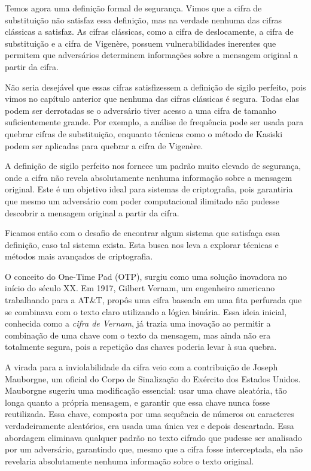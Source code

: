 Temos agora uma definição formal de segurança.
Vimos que a cifra de substituição não satisfaz essa definição, mas na verdade nenhuma das cifras clássicas a satisfaz.
As cifras clássicas, como a cifra de deslocamente, a cifra de substituição e a cifra de Vigenère, possuem vulnerabilidades inerentes que permitem que adversários determinem informações sobre a mensagem original a partir da cifra.

Não seria desejável que essas cifras satisfizessem a definição de sigilo perfeito, pois vimos no capítulo anterior que nenhuma das cifras clássicas é segura.
Todas elas podem ser derrotadas se o adversário tiver acesso a uma cifra de tamanho suficientemente grande.
Por exemplo, a análise de frequência pode ser usada para quebrar cifras de substituição, enquanto técnicas como o método de Kasiski podem ser aplicadas para quebrar a cifra de Vigenère.

A definição de sigilo perfeito nos fornece um padrão muito elevado de segurança, onde a cifra não revela absolutamente nenhuma informação sobre a mensagem original.
Este é um objetivo ideal para sistemas de criptografia, pois garantiria que mesmo um adversário com poder computacional ilimitado não pudesse descobrir a mensagem original a partir da cifra.

Ficamos então com o desafio de encontrar algum sistema que satisfaça essa definição, caso tal sistema exista.
Esta busca nos leva a explorar técnicas e métodos mais avançados de criptografia.

O conceito do One-Time Pad (OTP), surgiu como uma solução inovadora no início do século XX.
Em 1917, Gilbert Vernam, um engenheiro americano trabalhando para a AT\&T, propôs uma cifra baseada em uma fita perfurada que se combinava com o texto claro utilizando a lógica binária.
Essa ideia inicial, conhecida como a {\em cifra de Vernam}, já trazia uma inovação ao permitir a combinação de uma chave com o texto da mensagem, mas ainda não era totalmente segura, pois a repetição das chaves poderia levar à sua quebra.

A virada para a inviolabilidade da cifra veio com a contribuição de Joseph Mauborgne, um oficial do Corpo de Sinalização do Exército dos Estados Unidos.
Mauborgne sugeriu uma modificação essencial:
usar uma chave aleatória, tão longa quanto a própria mensagem, e garantir que essa chave nunca fosse reutilizada.
Essa chave, composta por uma sequência de números ou caracteres verdadeiramente aleatórios, era usada uma única vez e depois descartada.
Essa abordagem eliminava qualquer padrão no texto cifrado que pudesse ser analisado por um adversário, garantindo que, mesmo que a cifra fosse interceptada, ela não revelaria absolutamente nenhuma informação sobre o texto original.

